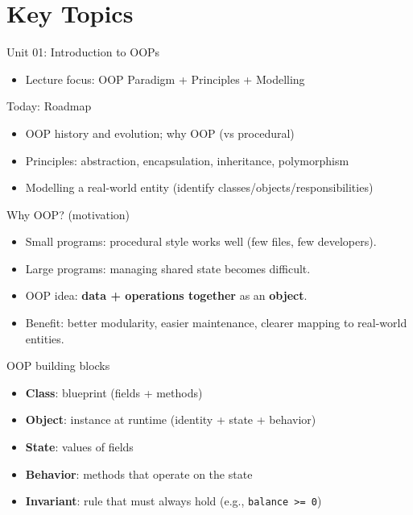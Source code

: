 \documentclass{beamer}
\begin{document}
\section{Key Topics}
\label{sec:concepts}

\begin{frame}{Unit 01: Introduction to OOPs}
  \begin{itemize}[<+->]
    \item Lecture focus: OOP Paradigm + Principles + Modelling
  \end{itemize}
  \slidesources{\OOPSUnitISources}
\end{frame}

\begin{frame}{Today: Roadmap}
  \begin{itemize}[<+->]
    \item OOP history and evolution; why OOP (vs procedural)
    \item Principles: abstraction, encapsulation, inheritance, polymorphism
    \item Modelling a real-world entity (identify classes/objects/responsibilities)
  \end{itemize}
  \slidesources{\OOPSUnitISources}
\end{frame}

\begin{frame}{Why OOP? (motivation)}
  \begin{itemize}[<+->]
    \item Small programs: procedural style works well (few files, few developers).
    \item Large programs: managing shared state becomes difficult.
    \item OOP idea: \textbf{data + operations together} as an \textbf{object}.
    \item Benefit: better modularity, easier maintenance, clearer mapping to real-world entities.
  \end{itemize}
  \slidesources{\OOPSUnitISources}
\end{frame}

\begin{frame}{OOP building blocks}
  \begin{itemize}[<+->]
    \item \textbf{Class}: blueprint (fields + methods)
    \item \textbf{Object}: instance at runtime (identity + state + behavior)
    \item \textbf{State}: values of fields
    \item \textbf{Behavior}: methods that operate on the state
    \item \textbf{Invariant}: rule that must always hold (e.g., \texttt{balance >= 0})
  \end{itemize}
  \slidesources{\OOPSUnitISources}
\end{frame}
\end{document}
